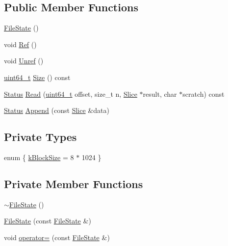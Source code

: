 \subsection*{Public Member Functions}
\begin{DoxyCompactItemize}
\item 
\hyperlink{classleveldb_1_1anonymous__namespace_02memenv_8cc_03_1_1_file_state_aa9bd1bcb90b9adf0d62e71c4d2859508}{File\+State} ()
\item 
void \hyperlink{classleveldb_1_1anonymous__namespace_02memenv_8cc_03_1_1_file_state_ab92319c7e9a9e36c3237feb7c1bae2b1}{Ref} ()
\item 
void \hyperlink{classleveldb_1_1anonymous__namespace_02memenv_8cc_03_1_1_file_state_a7df8c52dec3eb6d263fa1dc358d23faa}{Unref} ()
\item 
\hyperlink{stdint_8h_aaa5d1cd013383c889537491c3cfd9aad}{uint64\+\_\+t} \hyperlink{classleveldb_1_1anonymous__namespace_02memenv_8cc_03_1_1_file_state_a3e68670ea38eeca29e0d67638e115668}{Size} () const 
\item 
\hyperlink{classleveldb_1_1_status}{Status} \hyperlink{classleveldb_1_1anonymous__namespace_02memenv_8cc_03_1_1_file_state_add3a346d5cdaded237f6decfa1a4b71e}{Read} (\hyperlink{stdint_8h_aaa5d1cd013383c889537491c3cfd9aad}{uint64\+\_\+t} offset, size\+\_\+t n, \hyperlink{classleveldb_1_1_slice}{Slice} $\ast$result, char $\ast$scratch) const 
\item 
\hyperlink{classleveldb_1_1_status}{Status} \hyperlink{classleveldb_1_1anonymous__namespace_02memenv_8cc_03_1_1_file_state_aa1cb0d3ae6cad3dc73c52eae68e003cd}{Append} (const \hyperlink{classleveldb_1_1_slice}{Slice} \&data)
\end{DoxyCompactItemize}
\subsection*{Private Types}
\begin{DoxyCompactItemize}
\item 
enum \{ \hyperlink{classleveldb_1_1anonymous__namespace_02memenv_8cc_03_1_1_file_state_afd0441590b6ae8f2dbb319ac6c6164a8ae7245af3268158b3af9eb81c3f0f3fee}{k\+Block\+Size} = 8 $\ast$ 1024
 \}
\end{DoxyCompactItemize}
\subsection*{Private Member Functions}
\begin{DoxyCompactItemize}
\item 
\hyperlink{classleveldb_1_1anonymous__namespace_02memenv_8cc_03_1_1_file_state_a4871db78ba9e5a8bfa1c645831b8422d}{$\sim$\+File\+State} ()
\item 
\hyperlink{classleveldb_1_1anonymous__namespace_02memenv_8cc_03_1_1_file_state_ad6c048ca646392bc638d463acb8411a4}{File\+State} (const \hyperlink{classleveldb_1_1anonymous__namespace_02memenv_8cc_03_1_1_file_state}{File\+State} \&)
\item 
void \hyperlink{classleveldb_1_1anonymous__namespace_02memenv_8cc_03_1_1_file_state_a5b9aa50ab66af03cbad1fc4c935347d0}{operator=} (const \hyperlink{classleveldb_1_1anonymous__namespace_02memenv_8cc_03_1_1_file_state}{File\+State} \&)
\end{DoxyCompactItemize}
